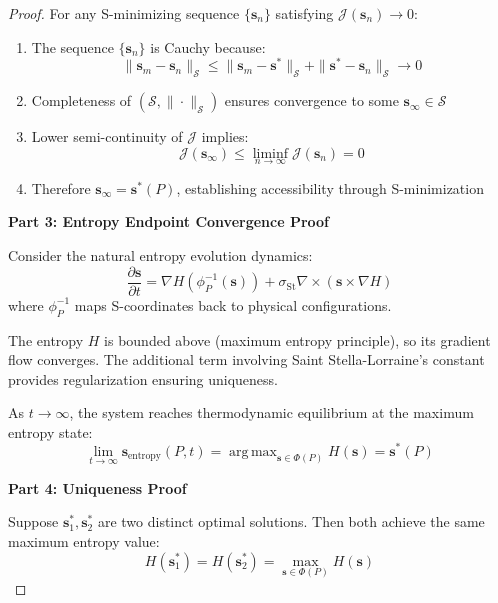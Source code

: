 \documentclass[11pt]{article}
\theoremstyle{definition}
\theoremstyle{remark}
\DeclareMathOperator{\argmax}{arg\,max}
\newcommand{\SEntropy}{\mathcal{S}}
\newcommand{\StellasConstant}{\sigma_{\text{St}}}
\begin{document}
\begin{proof}
For any S-minimizing sequence $\{\mathbf{s}_n\}$ satisfying $\mathcal{J}(\mathbf{s}_n) \to 0$:
\begin{enumerate}
\item The sequence $\{\mathbf{s}_n\}$ is Cauchy because:
   \begin{equation}
   \|\mathbf{s}_m - \mathbf{s}_n\|_{\SEntropy} \leq \|\mathbf{s}_m - \mathbf{s}^*\|_{\SEntropy} + \|\mathbf{s}^* - \mathbf{s}_n\|_{\SEntropy} \to 0
   \end{equation}
\item Completeness of $(\SEntropy, \|\cdot\|_{\SEntropy})$ ensures convergence to some $\mathbf{s}_{\infty} \in \SEntropy$
\item Lower semi-continuity of $\mathcal{J}$ implies:
   \begin{equation}
   \mathcal{J}(\mathbf{s}_{\infty}) \leq \liminf_{n \to \infty} \mathcal{J}(\mathbf{s}_n) = 0
   \end{equation}
\item Therefore $\mathbf{s}_{\infty} = \mathbf{s}^*(P)$, establishing accessibility through S-minimization
\end{enumerate}

\textbf{Part 3: Entropy Endpoint Convergence Proof}

Consider the natural entropy evolution dynamics:
\begin{equation}
\frac{\partial \mathbf{s}}{\partial t} = \nabla H(\phi_P^{-1}(\mathbf{s})) + \StellasConstant \nabla \times (\mathbf{s} \times \nabla H)
\end{equation}
where $\phi_P^{-1}$ maps S-coordinates back to physical configurations.

The entropy $H$ is bounded above (maximum entropy principle), so its gradient flow converges. The additional term involving Saint Stella-Lorraine's constant provides regularization ensuring uniqueness.

As $t \to \infty$, the system reaches thermodynamic equilibrium at the maximum entropy state:
\begin{equation}
\lim_{t \to \infty} \mathbf{s}_{\text{entropy}}(P, t) = \argmax_{\mathbf{s} \in \Phi(P)} H(\mathbf{s}) = \mathbf{s}^*(P)
\end{equation}

\textbf{Part 4: Uniqueness Proof}

Suppose $\mathbf{s}_1^*, \mathbf{s}_2^*$ are two distinct optimal solutions. Then both achieve the same maximum entropy value:
\begin{equation}
H(\mathbf{s}_1^*) = H(\mathbf{s}_2^*) = \max_{\mathbf{s} \in \Phi(P)} H(\mathbf{s})
\end{equation}


\end{proof}
\end{document}

